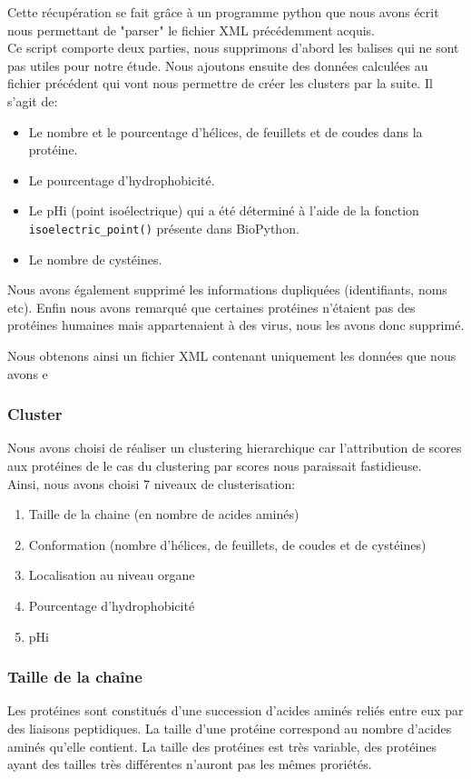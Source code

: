 Cette récupération se fait grâce à un programme python que nous avons écrit nous permettant de "parser" le fichier XML précédemment acquis.\\

Ce script comporte deux parties, nous supprimons d'abord les balises qui ne sont pas utiles pour notre étude.
Nous ajoutons ensuite des données calculées au fichier précédent qui vont nous permettre de créer les clusters par la suite. Il s'agit de:
\begin{itemize}
\item Le nombre et le pourcentage d'hélices, de feuillets et de coudes dans la protéine.
\item Le pourcentage d'hydrophobicité.
\item Le pHi (point isoélectrique) qui a été déterminé à l'aide de la fonction \texttt{isoelectric\_point()} présente dans BioPython.
\item Le nombre de cystéines.
\end{itemize}

Nous avons également supprimé les informations dupliquées (identifiants, noms etc).
Enfin nous avons remarqué que certaines protéines n'étaient pas des protéines humaines mais appartenaient à des virus, nous les avons donc supprimé.

Nous obtenons ainsi un fichier XML contenant uniquement les données que nous avons e


\subsubsection*{Cluster}
Nous avons choisi de réaliser un clustering hierarchique car l'attribution de scores aux protéines de le cas du clustering par scores nous paraissait fastidieuse.\\
Ainsi, nous avons choisi 7 niveaux de clusterisation:
\begin{enumerate}
\item Taille de la chaine (en nombre de acides aminés)
\item Conformation (nombre d'hélices, de feuillets, de coudes et de cystéines)
\item Localisation au niveau organe
\item Pourcentage d'hydrophobicité
\item pHi
\end{enumerate}


\subsubsection*{Taille de la chaîne}
Les protéines sont constitués d'une succession d'acides aminés reliés entre eux par des liaisons peptidiques. La taille d'une protéine correspond au nombre d'acides aminés qu'elle contient. La taille des protéines est très variable, des protéines ayant des tailles très différentes n'auront pas les m\^emes proriétés.

